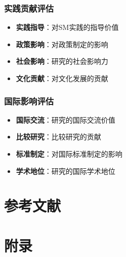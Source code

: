 \documentclass[12pt,UTF8]{ctexbook}
\begin{document}
\subsection{实践贡献评估}
\begin{itemize}[leftmargin=2cm]
	\item \textbf{实践指导}：对SM实践的指导价值
	\item \textbf{政策影响}：对政策制定的影响
	\item \textbf{社会影响}：研究的社会影响力
	\item \textbf{文化贡献}：对文化发展的贡献
\end{itemize}

\subsection{国际影响评估}
\begin{itemize}[leftmargin=2cm]
	\item \textbf{国际交流}：研究的国际交流价值
	\item \textbf{比较研究}：比较研究的贡献
	\item \textbf{标准制定}：对国际标准制定的影响
	\item \textbf{学术地位}：研究的国际学术地位
\end{itemize}

\backmatter

\chapter{参考文献}

\chapter{附录}
\end{document}
